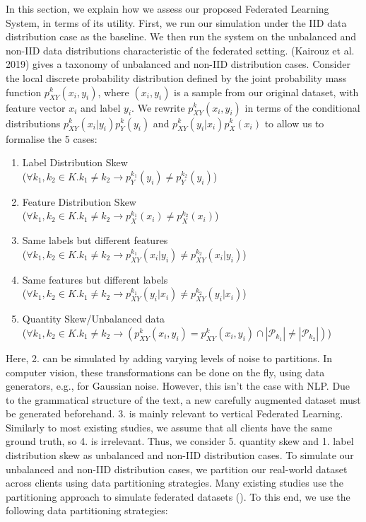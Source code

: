\documentclass[letterpaper]{article} %
\begin{document}
In this section, we explain how we assess our proposed Federated Learning System, in terms of its utility. First, we run our simulation under the IID data distribution case as the baseline. We then run the system on the unbalanced and non-IID data distributions characteristic of the federated setting. (Kairouz et al. 2019) gives a taxonomy of unbalanced and non-IID distribution cases. Consider the local discrete probability distribution defined by the joint probability mass function $p^k_{XY}(x_i, y_i)$, where $(x_i, y_i)$ is a sample from our original dataset, with feature vector $x_i$ and label $y_i$. We rewrite $p^k_{XY}(x_i, y_i)$  in terms of the conditional distributions $p^k_{XY}(x_i | y_i)p^k_Y(y_i)$ and $p^k_{XY}(y_i | x_i)p^k_X(x_i)$ to allow us to formalise the 5 cases:
\begin{enumerate}
\item Label Distribution Skew \\ ($\forall{k_1, k_2 \in K}. k_1 \neq k_2 \rightarrow p^{k_1}_Y(y_i) \neq p^{k_2}_Y(y_i)$)
\item Feature Distribution Skew \\ ($\forall{k_1, k_2 \in K}. k_1 \neq k_2 \rightarrow p^{k_1}_X(x_i) \neq p^{k_2}_X(x_i)$)
\item Same labels but different features \\ ($\forall{k_1, k_2 \in K}. k_1 \neq k_2 \rightarrow p^{k_1}_{XY}(x_i | y_i) \neq p^{k_2}_{XY}(x_i | y_i)$)
\item Same features but different labels \\ ($\forall{k_1, k_2 \in K}. k_1 \neq k_2 \rightarrow p^{k_1}_{XY}(y_i | x_i) \neq p^{k_2}_{XY}(y_i | x_i)$)
\item Quantity Skew/Unbalanced data \\ ($\forall{k_1, k_2 \in K}. k_1 \neq k_2 \rightarrow (p^k_{XY}(x_i, y_i) = p^k_{XY}(x_i, y_i) \cap |\mathcal{P}_{k_1}| \neq |\mathcal{P}_{k_2}|)$)
\end{enumerate}
Here, 2. can be simulated by adding varying levels of noise to partitions. In computer vision, these transformations can be done on the fly, using data generators, e.g., for Gaussian noise. However, this isn't the case with NLP. Due to the grammatical structure of the text, a new carefully augmented dataset must be generated beforehand. 3. is mainly relevant to vertical Federated Learning. Similarly to most existing studies, we assume that all clients have the same ground truth, so 4. is irrelevant. Thus, we consider 5. quantity skew and 1. label distribution skew as unbalanced and non-IID distribution cases. To simulate our unbalanced and non-IID distribution cases, we partition our real-world dataset across clients using data partitioning strategies. Many existing studies use the partitioning approach to simulate federated datasets (). To this end, we use the following data partitioning strategies:
\end{document}
